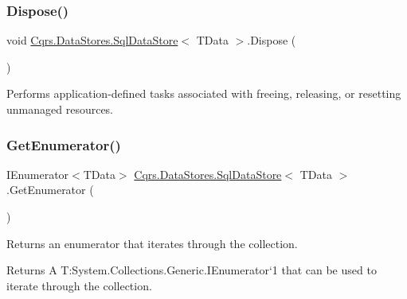 \mbox{\label{classCqrs_1_1DataStores_1_1SqlDataStore_a975c0087677987dffccc4f0ffa97e691_a975c0087677987dffccc4f0ffa97e691}} 
\subsubsection{\texorpdfstring{Dispose()}{Dispose()}}
{\footnotesize\ttfamily void \hyperlink{classCqrs_1_1DataStores_1_1SqlDataStore}{Cqrs.\+Data\+Stores.\+Sql\+Data\+Store}$<$ T\+Data $>$.Dispose (\begin{DoxyParamCaption}{ }\end{DoxyParamCaption})}



Performs application-\/defined tasks associated with freeing, releasing, or resetting unmanaged resources. 

\mbox{\label{classCqrs_1_1DataStores_1_1SqlDataStore_a774a0a12d6a89479cf25191916f51c47_a774a0a12d6a89479cf25191916f51c47}} 
\subsubsection{\texorpdfstring{Get\+Enumerator()}{GetEnumerator()}}
{\footnotesize\ttfamily I\+Enumerator$<$T\+Data$>$ \hyperlink{classCqrs_1_1DataStores_1_1SqlDataStore}{Cqrs.\+Data\+Stores.\+Sql\+Data\+Store}$<$ T\+Data $>$.Get\+Enumerator (\begin{DoxyParamCaption}{ }\end{DoxyParamCaption})}



Returns an enumerator that iterates through the collection. 

\begin{DoxyReturn}{Returns}
A T\+:\+System.\+Collections.\+Generic.\+I\+Enumerator`1 that can be used to iterate through the collection. 
\end{DoxyReturn}
\mbox{\label{classCqrs_1_1DataStores_1_1SqlDataStore_a898d15db199f054865a96ac646bf54fb_a898d15db199f054865a96ac646bf54fb}} 
